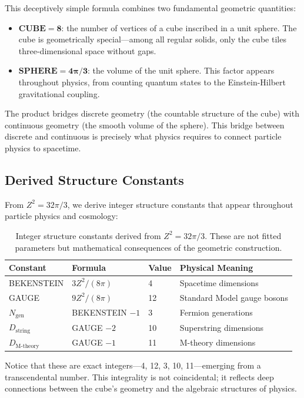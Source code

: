 \documentclass[11pt,a4paper]{article}
\theoremstyle{plain}
\theoremstyle{definition}
\theoremstyle{remark}
\newcommand{\Ngen}{N_{\text{gen}}}
\begin{document}
This deceptively simple formula combines two fundamental geometric quantities:
\begin{itemize}
  \item $\mathbf{CUBE = 8}$: the number of vertices of a cube inscribed in a unit sphere. The cube is geometrically special---among all regular solids, only the cube tiles three-dimensional space without gaps.
  \item $\mathbf{SPHERE = 4\pi/3}$: the volume of the unit sphere. This factor appears throughout physics, from counting quantum states to the Einstein-Hilbert gravitational coupling.
\end{itemize}

The product bridges discrete geometry (the countable structure of the cube) with continuous geometry (the smooth volume of the sphere). This bridge between discrete and continuous is precisely what physics requires to connect particle physics to spacetime.

\subsection{Derived Structure Constants}

From $Z^2 = 32\pi/3$, we derive integer structure constants that appear throughout particle physics and cosmology:

\begin{table}[h!]
\centering
\begin{tabular}{llll}
\toprule
\textbf{Constant} & \textbf{Formula} & \textbf{Value} & \textbf{Physical Meaning} \\
\midrule
BEKENSTEIN & $3Z^2/(8\pi)$ & 4 & Spacetime dimensions \\
GAUGE & $9Z^2/(8\pi)$ & 12 & Standard Model gauge bosons \\
$\Ngen$ & BEKENSTEIN $- 1$ & 3 & Fermion generations \\
$D_{\text{string}}$ & GAUGE $- 2$ & 10 & Superstring dimensions \\
$D_{\text{M-theory}}$ & GAUGE $- 1$ & 11 & M-theory dimensions \\
\bottomrule
\end{tabular}
\caption{Integer structure constants derived from $Z^2 = 32\pi/3$. These are not fitted parameters but mathematical consequences of the geometric construction.}
\end{table}

Notice that these are exact integers---4, 12, 3, 10, 11---emerging from a transcendental number. This integrality is not coincidental; it reflects deep connections between the cube's geometry and the algebraic structures of physics.
\end{document}
